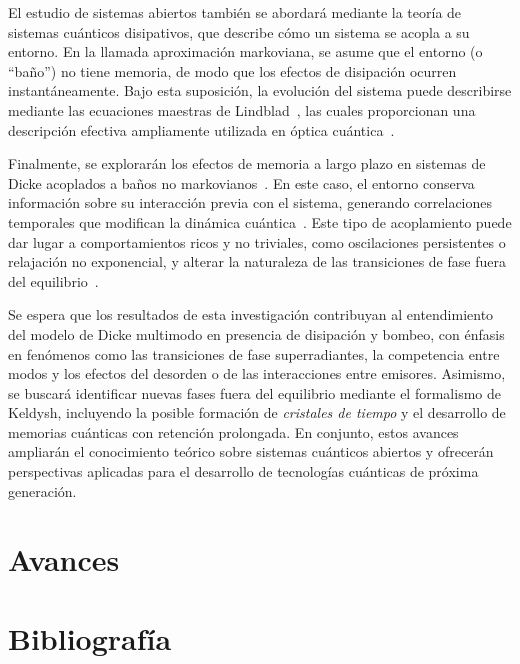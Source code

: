 \documentclass[onecolumn,notitlepage,letterpaper,aps,pra,12pt]{article}
\numberwithin{equation}{section}
\begin{document}
El estudio de sistemas abiertos también se abordará mediante la teoría de sistemas cuánticos disipativos, que describe cómo un sistema se acopla a su entorno. En la llamada aproximación markoviana, se asume que el entorno (o “baño”) no tiene memoria, de modo que los efectos de disipación ocurren instantáneamente. Bajo esta suposición, la evolución del sistema puede describirse mediante las ecuaciones maestras de Lindblad~\cite{breuer2003,Lindblad1976}, las cuales proporcionan una descripción efectiva ampliamente utilizada en óptica cuántica~\cite{weiss2012}.

Finalmente, se explorarán los efectos de memoria a largo plazo en sistemas de Dicke acoplados a baños no markovianos~\cite{zhu2019,lundgren2020,fiorelli2020}. En este caso, el entorno conserva información sobre su interacción previa con el sistema, generando correlaciones temporales que modifican la dinámica cuántica~\cite{orazio2016}. Este tipo de acoplamiento puede dar lugar a comportamientos ricos y no triviales, como oscilaciones persistentes o relajación no exponencial, y alterar la naturaleza de las transiciones de fase fuera del equilibrio~\cite{lundgren2020}.

Se espera que los resultados de esta investigación contribuyan al entendimiento del modelo de Dicke multimodo en presencia de disipación y bombeo, con énfasis en fenómenos como las transiciones de fase superradiantes, la competencia entre modos y los efectos del desorden o de las interacciones entre emisores. Asimismo, se buscará identificar nuevas fases fuera del equilibrio mediante el formalismo de Keldysh, incluyendo la posible formación de \textit{cristales de tiempo} y el desarrollo de memorias cuánticas con retención prolongada. En conjunto, estos avances ampliarán el conocimiento teórico sobre sistemas cuánticos abiertos y ofrecerán perspectivas aplicadas para el desarrollo de tecnologías cuánticas de próxima generación.



\section{Avances}






\section{Bibliografía}
\end{document}
